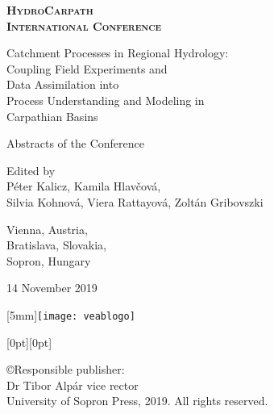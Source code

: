 \documentclass[10pt,a5paper,twoside]{book}
\begin{document}
\newcommand{\abstrtitle}[1]{\Large \textbf{\textsc{#1}}\normalsize \smallskip}
\newcommand{\name}[1]{\textbf{\textsc{#1}}\smallskip}
\newcommand{\institute}[1]{\footnotesize #1}
\newcommand{\email}[1]{\texttt{#1}\normalsize}

\begin{titlepage}
\centering
\scshape
\large
\bfseries
HydroCarpath \\
International Conference

\vspace{0.5cm}
Catchment Processes in Regional Hydrology:\\
Coupling Field Experiments and\\
Data Assimilation into\\
Process Understanding and Modeling in\\
Carpathian Basins
\upshape
\normalsize
\mdseries

\vspace{1cm}
Abstracts of the Conference

\vspace{3cm}
Edited by\\
Péter Kalicz, Kamila Hlavčová,\\
Silvia Kohnová, Viera Rattayová, Zoltán Gribovszki


\vfill
Vienna, Austria, \\
Bratislava, Slovakia, \\
Sopron, Hungary

14 November 2019
\end{titlepage}

\newpage{}
\thispagestyle{empty}
\hspace*{\fill} \hspace{4mm} \raisebox{-11mm}[5mm]{\texttt{[image: veablogo]}}


\vspace*{\fill}

\hspace*{\fill} \hspace{1mm} \raisebox{0mm}[0pt][0pt]{}

\noindent{}\copyright{\footnotesize{}Responsible publisher:\\ Dr Tibor Alpár vice rector\\ University of Sopron Press, 2019. All rights reserved.}




\setcounter{page}{2}

\fancyhead[LE,RO]{\thepage}


\tableofcontents{}
\newpage{}

\setcounter{articleid}{0}


\printindex
\end{document}
